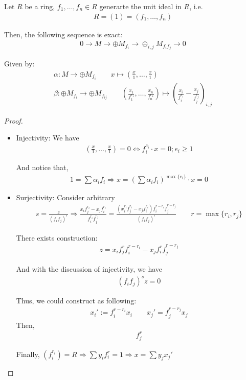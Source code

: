 \documentclass[Total.tex]{subfiles}
\begin{document}
			\begin{lemma}
				Let $R$ be a ring, $f_1,\dots,f_n\in R$ generarte the unit ideal in $R$, i.e. 
				\begin{gather*}
					R=(1)=(f_1,\dots,f_n)
				\end{gather*}
				
				Then, the following sequence is exact:
				\begin{gather*}
					0\rightarrow M\rightarrow \oplus M_{f_i}\rightarrow \oplus_{i,j} M	_{f_if_j}\rightarrow 0
				\end{gather*}
				
				Given by:
				\begin{gather*}
					\alpha:M\rightarrow \oplus M_{f_i}\qquad x\mapsto (\frac{x}{1},\dots,\frac{x}{1})\\
					\beta:\oplus M_{f_i}\rightarrow \oplus M_{f_{ij}}\qquad (\frac{x_1}{f_1^{r_1}},\dots,\frac{x_n}{f_n^{r_n}})\mapsto (\frac{x_i}{f_i^{r_i}}-\frac{x_j}{f_j^{r_j}})_{i,j}
				\end{gather*}
			\end{lemma}
			\begin{proof}
				\begin{itemize}
					\item Injectivity: We have
					\begin{gather*}
						(\frac{x}{1},\dots,\frac{x}{1})=0\Leftrightarrow f_i^{e_i}\cdot x=0;e_i\geq 1 
					\end{gather*} 
					
					And notice that,
					\begin{gather*}
						1=\sum \alpha_i f_i\Rightarrow x=(\sum \alpha_i f_i)^{\max\{e_i\}}\cdot x=0
					\end{gather*}
					\item Surjectivity: Consider arbitrary 
					\begin{gather*}
						s=\frac{z}{(f_if_j)^r}\Rightarrow \frac{x_if_j^{r_i}-x_j f_i^{r_i}}{f_i^{r_i}f_j^{r_j}}=\frac{(x_i^{r_i}f_j^{r_i}-x_jf_i^{r_i})f_i^{r-r_i}f_j^{r-r_j}}{(f_if_j)^r}\qquad r=\max\{r_i,r_j\}
					\end{gather*}
					
					There exists construction:
					\begin{gather*}
						z=x_if_j^{r}f_i^{r-r_i}-x_j f_i^r f_j^{r-r_j}
					\end{gather*}
					
					And with the discussion of injectivity, we have
					\begin{gather*}
						(f_if_j)^{s}z=0
					\end{gather*}
					
					Thus, we could construct as following:
					\begin{gather*}
						x_i':=f_i^{r-r_i}x_i\qquad x_j'=f_j^{r-r_j}x_j
					\end{gather*}
					Then,
					\begin{gather*}
						f_j^r
					\end{gather*}
					
					Finally, $(f_i^{r_i})=R\Rightarrow \sum y_i f_i^{r}=1\Rightarrow x=\sum y_j x_j'$
				\end{itemize}
			\end{proof}
			
\end{document}
